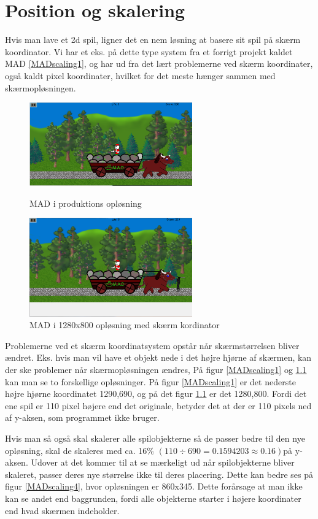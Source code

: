 \documentclass[Main.tex]{PositionOgSkalering}
\begin{document}
\chapter{Position og skalering}
Hvis man lave et  2d spil, ligner det en nem løsning at basere sit spil på skærm koordinator. Vi har et eks. på dette type system fra et forrigt projekt kaldet MAD \ref{MADscaling1}, og har ud fra det lært problemerne ved skærm koordinater, også kaldt pixel koordinater, hvilket for det meste hænger sammen med skærmopløsningen.

\begin{figure}[h]
\centering
\parbox{7cm}{   
\includegraphics[width = 7cm]{billeder/MADscaling1}
\caption{MAD i produktions opløsning}    
\label{MADscaling1}}
\qquad
\begin{minipage}{7cm}
\includegraphics[width = 7cm]{billeder/MADscaling2}
\caption{MAD i 1280x800 opløsning med skærm kordinator}    
\label{MADscaling2}
\end{minipage}
\end{figure}

Problemerne ved et skærm koordinatsystem opstår når skærmstørrelsen bliver ændret. Eks. hvis man vil have et objekt nede i det højre hjørne af skærmen, kan der ske problemer når  skærmopløsningen ændres, På figur \ref{MADscaling1} og \ref{MADscaling2} kan man se to forskellige opløsninger. På figur \ref{MADscaling1} er det nederste højre hjørne koordinatet 1290,690, og på det figur \ref{MADscaling2} er det 1280,800. Fordi det ene spil er 110 pixel højere end det originale, betyder det at der er 110 pixels ned af y-aksen, som programmet ikke bruger.

Hvis man så også skal skalerer alle spilobjekterne så de passer bedre til den nye opløsning, skal de skaleres med ca. 16\% \begin{math} (110 \div 690  = 0.1594203 \approx 0.16) \end{math}på y-aksen. Udover at det kommer til at se mærkeligt ud når spilobjekterne bliver skaleret, passer deres nye størrelse ikke til deres placering. Dette kan bedre ses på figur \ref{MADscaling4}, hvor opløsningen er 860x345. Dette forårsage at man ikke kan se andet end baggrunden, fordi alle objekterne starter i højere koordinater end hvad skærmen indeholder.
\end{document}
